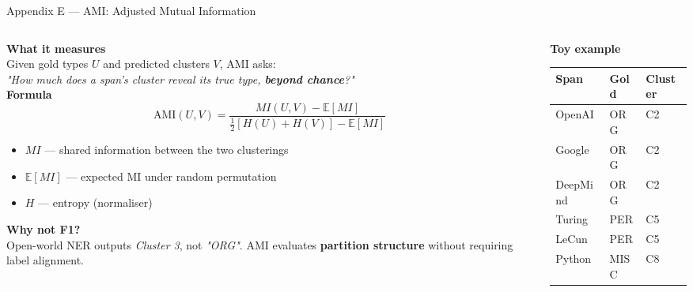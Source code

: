 \documentclass[aspectratio=169,10pt]{beamer}
\begin{document}
\begin{frame}{Appendix E — AMI: Adjusted Mutual Information}
  \begin{columns}[T]
    \begin{column}{0.54\textwidth}
      \textbf{What it measures}\\[2pt]
      \small
      Given gold types $U$ and predicted clusters $V$, AMI asks:\\[2pt]
      \emph{"How much does a span's cluster reveal its true type, \textbf{beyond chance}?"}\\[5pt]

      \textbf{Formula}\\[2pt]
      \footnotesize
      \[
        \mathrm{AMI}(U,V) =
          \frac{MI(U,V) - \mathbb{E}[MI]}
               {\tfrac{1}{2}[H(U)+H(V)] - \mathbb{E}[MI]}
      \]
      \small
      \begin{itemize}
        \setlength{\itemsep}{2pt}
        \item $MI$ — shared information between the two clusterings
        \item $\mathbb{E}[MI]$ — expected MI under random permutation
        \item $H$ — entropy (normaliser)
      \end{itemize}
      \vspace{4pt}
      \textbf{Why not F1?}\\[2pt]
      Open-world NER outputs \textit{Cluster 3}, not \textit{"ORG"}. AMI evaluates \textbf{partition structure} without requiring label alignment.
    \end{column}
    \begin{column}{0.44\textwidth}
      \textbf{Toy example}\\[4pt]
      \footnotesize
      \begin{tabular}{lll}
        \toprule
        \textbf{Span} & \textbf{Gold} & \textbf{Cluster} \\
        \midrule
        OpenAI  & ORG  & C2 \\
        Google  & ORG  & C2 \\
        DeepMind& ORG  & C2 \\
        Turing  & PER  & C5 \\
        LeCun   & PER  & C5 \\
        Python  & MISC & C8 \\
        \bottomrule
      \end{tabular}
      \vspace{6pt}


\end{column}
\end{columns}
\end{frame}
\end{document}
